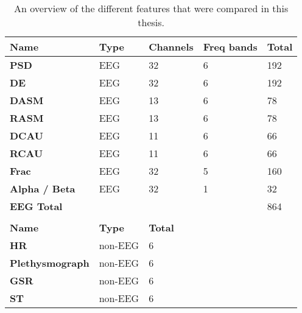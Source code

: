 \documentclass[11pt,journal,compsoc]{IEEEtran}
\begin{document}
\begin{table}[H]
\centering
\caption{An overview of the different features that were compared in this thesis.\label{featOverviewTable}}
\begin{tabular}{l|llll}
\textbf{Name}           & \textbf{Type} & \textbf{Channels}   & \textbf{Freq bands} & \textbf{Total} \\ \hline
\textbf{PSD}            & EEG           & 32                            & 6                         & 192          \\
\textbf{DE}             & EEG           & 32                            & 6                         & 192          \\
\textbf{DASM}           & EEG           & 13                            & 6                         & 78           \\
\textbf{RASM}           & EEG           & 13                            & 6                         & 78           \\
\textbf{DCAU}           & EEG           & 11                            & 6                         & 66           \\
\textbf{RCAU}           & EEG  			& 11                            & 6                         & 66           \\
\textbf{Frac}           & EEG           & 32                            & 5                         & 160          \\
\textbf{Alpha / Beta}   & EEG           & 32                            & 1                         & 32           \\
\textbf{EEG Total}      &               &                               &                           & 864          \\ \hline
                        &               &                               &                           &              \\
\textbf{Name}           & \textbf{Type} & \textbf{Total} 			&                          &              \\ \hline
\textbf{HR}             & non-EEG       & 6                             &                           &              \\
\textbf{Plethysmograph} & non-EEG       & 6                             &                           &              \\
\textbf{GSR}            & non-EEG       & 6                             &                           &              \\
\textbf{ST}             & non-EEG       & 6                             &                           &              \\

\end{tabular}
\end{table}
\end{document}
